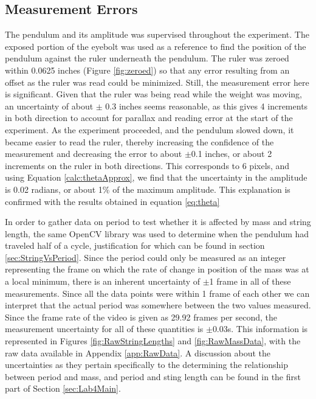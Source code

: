 \documentclass[11pt]{article}
\begin{document}
        \subsection{Measurement Errors}\label{SourcesOfError:MeasurementErrors}
        The pendulum and its amplitude was supervised throughout the experiment. The exposed portion of the eyebolt was used as a reference to find the position of the pendulum against the ruler underneath the pendulum. The ruler was zeroed within 0.0625 inches (Figure \ref{fig:zeroed}) so that any error resulting from an offset as the ruler was read could be minimized. Still, the measurement error here is significant. Given that the ruler was being read while the weight was moving, an uncertainty of about $\pm$ 0.3 inches seems reasonable, as this gives 4 increments in both direction to account for parallax and reading error at the start of the experiment. As the experiment proceeded, and the pendulum slowed down, it became easier to read the ruler, thereby increasing the confidence of the measurement and decreasing the error to about $\pm$0.1 inches, or about 2 increments on the ruler in both directions. This corresponds to 6 pixels, and using Equation \ref{calc:thetaApprox}, we find that the uncertainty in the amplitude is 0.02 radians, or about 1\% of the maximum amplitude. This explanation is confirmed with the results obtained in equation \ref{eq:theta}
        
        In order to gather data on period to test whether it is affected by mass and string length, the same OpenCV library was used to determine when the pendulum had traveled half of a cycle, justification for which can be found in section \ref{sec:StringVsPeriod}. Since the period could only be measured as an integer representing the frame on which the rate of change in position of the mass was at a local minimum, there is an inherent uncertainty of $\pm$1 frame in all of these measurements. Since all the data points were within 1 frame of each other we can interpret that the actual period was somewhere between the two values measured. Since the frame rate of the video is given as 29.92 frames per second, the measurement uncertainty for all of these quantities is $\pm$0.03s. This information is represented in Figures \ref{fig:RawStringLengths} and \ref{fig:RawMassData}, with the raw data available in Appendix \ref{app:RawData}. A discussion about the uncertainties as they pertain specifically to the determining the relationship between period and mass, and period and sting length can be found in the first part of Section \ref{sec:Lab4Main}.
\end{document}
